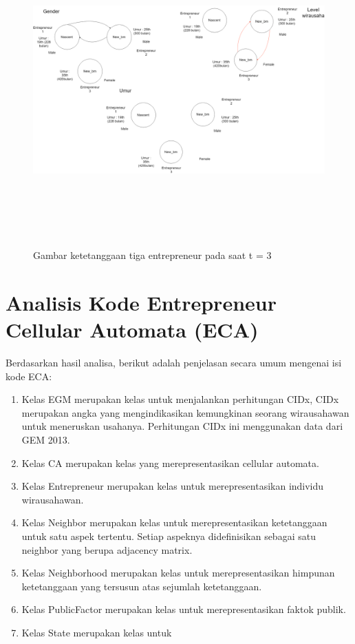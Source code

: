 	\begin{figure} [H]
		\centering  
		\includegraphics[width=18cm, height=12cm]{gambarwirausaha(t=3)} 
		\caption[Gambar ketetanggaan tiga entrepreneur pada saat t = 3]{Gambar ketetanggaan tiga entrepreneur pada saat t = 3} 
		\label{fig:t0} 
	\end{figure}
	

\section{Analisis Kode Entrepreneur Cellular Automata (ECA)}
\label{sec:analisisKode}

Berdasarkan hasil analisa, berikut adalah penjelasan secara umum mengenai isi kode ECA:
\begin{enumerate}
	\item Kelas EGM merupakan kelas untuk menjalankan perhitungan CIDx, CIDx merupakan angka yang mengindikasikan kemungkinan seorang wirausahawan untuk meneruskan usahanya. Perhitungan CIDx ini menggunakan data dari GEM 2013.
	\item Kelas CA merupakan kelas yang merepresentasikan cellular automata.
	\item Kelas Entrepreneur merupakan kelas untuk merepresentasikan individu wirausahawan.
	\item Kelas Neighbor merupakan kelas untuk merepresentasikan ketetanggaan untuk satu aspek tertentu. Setiap aspeknya didefinisikan sebagai satu neighbor yang berupa adjacency matrix.
	\item Kelas Neighborhood merupakan kelas untuk merepresentasikan himpunan ketetanggaan yang tersusun atas sejumlah ketetanggaan.
	\item Kelas PublicFactor merupakan kelas untuk merepresentasikan faktok publik.
	\item Kelas State merupakan kelas untuk 
\end{enumerate}
	
